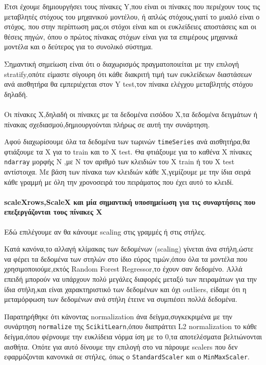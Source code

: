 Έτσι έχουμε δημιουργήσει τους πίνακες Y,που είναι οι πίνακες που περιέχουν τους τις μεταβλητές στόχους του μηχανικού μοντέλου,
ή απλώς στόχους,γιατί το μυαλό είναι ο στόχος, που στην περίπτωση μας,οι στόχοι είναι και οι ευκλείδειες αποστάσεις και οι θέσεις πηγών,
όπου ο πρώτος πίνακας στόχων είναι για τα επιμέρους μηχανικά μοντέλα και ο δεύτερος για το συνολικό σύστημα.

Σημαντική σημείωση είναι ότι ο διαχωρισμός πραγματοποιείται με την επιλογή stratify,οπότε είμαστε σίγουρη ότι κάθε διακριτή
τιμή των ευκλείδειων διαστάσεων ανά αισθητήρα θα εμπεριέχεται στον Y test,τον πίνακα ελέγχου μεταβλητής στόχου δηλαδή.

\paragraph{\texttt{}}

Οι πίνακες X,δηλαδή οι πίνακες με τα δεδομένα εισόδου X,τα δεδομένα δειγμάτων ή πίνακας σχεδιασμού,δημιουργούνται πλήρως σε αυτή την συνάρτηση.

Αφού διαχωρίσουμε όλα τα δεδομένα των τωρινών \texttt{timeSeries} ανά αισθητήρα,θα φτιάξουμε τα X για το train και το X test.
Θα φτιάξουμε για το καθένα X πίνακες \texttt{ndarray} μορφής N ,με N τον αριθμό των κλειδιών του X train ή του X test αντίστοιχα.
Με βάση των πίνακα των κλειδιών κάθε X,γεμίζουμε με την ίδια σειρά κάθε γραμμή με όλη την χρονοσειρά του πειράματος που έχει αυτό το κλειδί.

\paragraph{scaleXrows,ScaleX και μία σημαντική υποσημείωση για τις συναρτήσεις που επεξεργάζονται τους πίνακες X}

Εδώ επιλέγουμε αν θα κάνουμε scaling στις γραμμές ή στις στήλες.

Κατά κανόνα,το αλλαγή κλίμακας των δεδομένων (scaling) γίνεται άνα στήλη,ώστε να φέρει τα δεδομένα των στηλών στο ίδιο εύρος τιμών,όπου όλα τα μοντέλα 
που χρησιμοποιούμε,εκτός Random Forest Regressor,το έχουν σαν δεδομένο.
Αλλά επειδή μπορούν να υπάρχουν πολύ μεγάλες διαφορές μεταξύ των πειραμάτων για την ίδια στήλη,και είναι χαρακτηριστικό των δεδομένων και όχι outliers,
είδαμε ότι η μεταμόρφωση των δεδομένων ανά στήλη έτεινε να συμπιέσει πολλά δεδομένα.

Παρατηρήθηκε ότι κάνοντας normalization άνα δείγμα,συγκεκριμένα με την συνάρτηση \texttt{normalize} της \texttt{Scikit\-Learn},όπου διαπράττει  
L2 normalization το κάθε δείγμα,όπου φέρνουμε την ευκλίδεια νόρμα ίση με το 0,τα αποτελέσματα βελτιώνονται αισθήτα.
Οπότε για αυτό δίνουμε την επιλογή στο να πάρουμε scalers που δεν εφαρμόζονται κανονικά σε στήλες,
όπως ο \texttt{StandardScaler} και ο \texttt{MinMaxScaler}.

